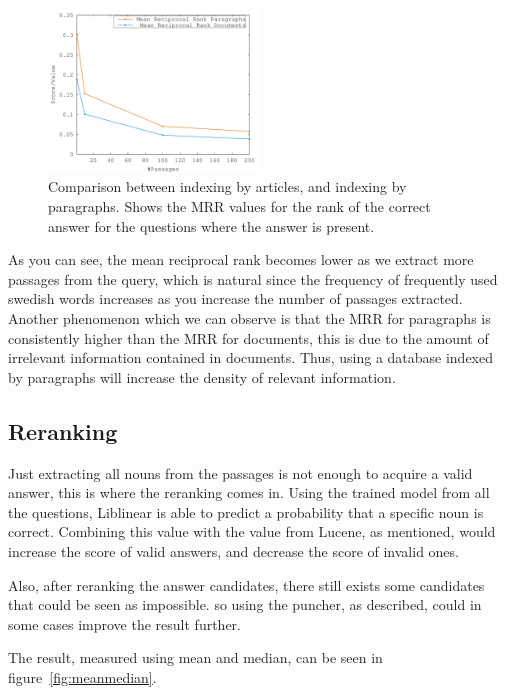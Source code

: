 \begin{figure}[h!]
  \centering
  \includegraphics[width=0.5\textwidth]{figures/median.pdf}
  \caption{Comparison between indexing by articles, and indexing by paragraphs. 
  Shows the MRR values for the rank of the correct answer for the questions where 
  the answer is present.}
  \label{fig:median}
\end{figure}

As you can see, the mean reciprocal rank becomes lower as we extract more passages from the query, which
is natural since the frequency of frequently used swedish words increases as you increase the number
of passages extracted. Another phenomenon which we can observe is that the MRR for 
paragraphs is consistently higher than the MRR for documents, this is due to the amount of irrelevant
information contained in documents. Thus, using a database indexed by paragraphs will increase 
the density of relevant information.

\subsection{Reranking}
Just extracting all nouns from the passages is not enough to acquire a valid answer, this is where the reranking comes in.
Using the trained model from all the questions, Liblinear is able to predict a probability that a specific noun is correct.
Combining this value with the value from Lucene, as mentioned, would increase the score of valid answers, and decrease the score of invalid ones.

Also, after reranking the answer candidates, there still exists some candidates that could be seen as impossible.
so using the puncher, as described, could in some cases improve the result further.

The result, measured using mean and median, can be seen in figure~\ref{fig:meanmedian}.

